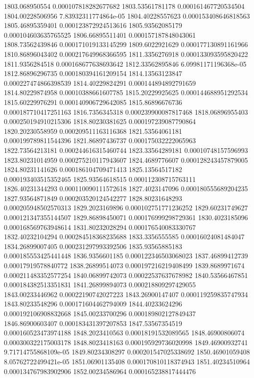 {1803.068950554 0.000107818282677682
1803.53561781178 0.000161467720534504
1804.00228506956 7.83932311774864e-05
1804.40228557623 0.000153408646818563
1805.46895359401 0.000123872924513616
1805.93562085179 0.000104603635765525
1806.66895511401 0.000157187848043061
1808.73562439846 0.000171019133145299
1809.6022921629 0.000177130891161966
1810.86896043402 0.000217649968366595
1811.3356276918 0.000133093595820422
1811.9356284518 0.000168677638693642
1812.33562895846 6.09981171196368e-05
1812.86896296735 0.000180394161209154
1814.13563123847 0.000227474866398539
1814.40229824291 0.000144894892791659
1814.80229874958 0.00010388661607785
1815.20229925625 0.000144688951292534
1815.60229976291 0.000140906729642085
1815.86896676736 0.000187710417251163
1816.7356345318 0.000239900087817468
1818.06896955403 0.000250194910215306
1818.80230381625 0.000197239087790864
1820.20230558959 0.000209511163116368
1821.53564061181 0.000199789811544396
1821.86897436737 0.000175032222065963
1822.73564213181 0.000244616315460744
1823.33564289181 0.00010748157596993
1823.80231014959 0.000275210117943607
1824.4689776607 0.000128243457879005
1824.80231141626 0.000186104709471413
1825.13564517182 0.000193403515352465
1825.93564618515 0.000112308715763111
1826.40231344293 0.000110090111572618
1827.4023147096 0.000180555689204235
1827.93564871849 0.000203520124542277
1828.80231648293 0.000205948502570313
1829.2023169896 0.000102751771236252
1829.60231749627 0.000121347355144507
1829.86898450071 0.000176999298729361
1830.4023185096 0.000168569763948614
1831.80232028294 0.000176540083330767
1832.40232104294 0.000284518368235688
1833.3356555585 0.00016024081484047
1834.26899007405 0.000231297993392506
1835.93565885183 0.000185553425441448
1836.9356601185 0.000122346503068023
1837.46899412739 0.00017919578840772
1838.26899514073 0.000197216219408499
1839.8689971674 0.000211483352577254
1840.06899742073 0.00022537637678982
1840.53566467851 0.000184382513351831
1841.26899894073 0.000218809297429055
1843.00233446962 0.00022190742027223
1843.26900147407 0.000119259835747934
1843.80233548296 0.000171604462794009
1844.40233624296 0.000192106908832668
1845.00233700296 0.000189802127849437
1846.86900603407 0.000183431397207853
1847.53567354519 0.000160523473974188
1848.2023410563 0.00018191532089565
1848.46900806074 0.000300322175003178
1848.8023418163 0.000195929736020998
1849.46900932741 9.71714755868109e-05
1849.80234308297 0.000201547025338692
1850.46901059408 8.05762722499421e-05
1851.06901135408 0.000170810118374943
1851.40234510964 0.000134767983902906
1852.00234586964 0.000165238817444476
}
